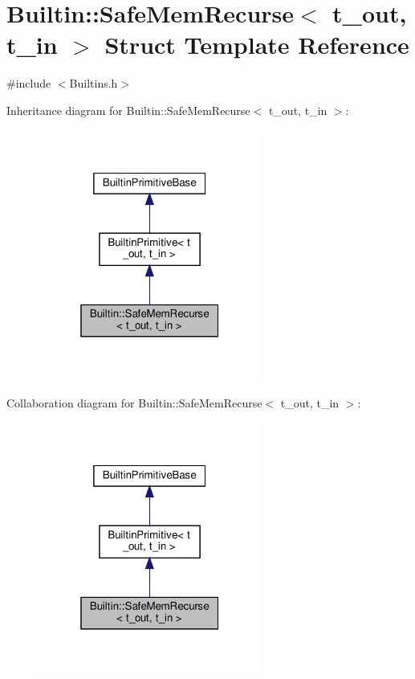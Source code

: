 \hypertarget{struct_builtin_1_1_safe_mem_recurse}{}\section{Builtin\+:\+:Safe\+Mem\+Recurse$<$ t\+\_\+out, t\+\_\+in $>$ Struct Template Reference}
\label{struct_builtin_1_1_safe_mem_recurse}


{\ttfamily \#include $<$Builtins.\+h$>$}



Inheritance diagram for Builtin\+:\+:Safe\+Mem\+Recurse$<$ t\+\_\+out, t\+\_\+in $>$\+:
\nopagebreak
\begin{figure}[H]
\begin{center}
\leavevmode
\includegraphics[width=208pt]{struct_builtin_1_1_safe_mem_recurse__inherit__graph}
\end{center}
\end{figure}


Collaboration diagram for Builtin\+:\+:Safe\+Mem\+Recurse$<$ t\+\_\+out, t\+\_\+in $>$\+:
\nopagebreak
\begin{figure}[H]
\begin{center}
\leavevmode
\includegraphics[width=208pt]{struct_builtin_1_1_safe_mem_recurse__coll__graph}
\end{center}
\end{figure}
